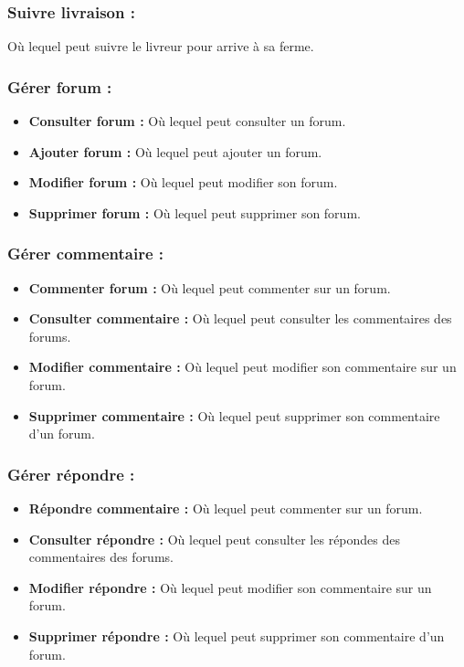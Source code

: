 \documentclass[16pt,fleqn]{article} %
\begin{document}
\subsubsection{Suivre livraison :}
Où lequel peut suivre le livreur pour arrive à sa ferme.

\subsubsection{Gérer forum :}
    \begin{itemize}
        \item \textbf{Consulter forum :} Où lequel peut consulter un forum.
        \item \textbf{Ajouter forum :} Où lequel peut ajouter un forum.
        \item \textbf{Modifier forum :} Où lequel peut modifier son forum.
        \item \textbf{Supprimer forum :} Où lequel peut supprimer son forum.
    \end{itemize}
    
\subsubsection{Gérer commentaire :}
    \begin{itemize}
        \item \textbf{Commenter forum :} Où lequel peut commenter sur un forum.
        \item \textbf{Consulter commentaire :} Où lequel peut consulter les commentaires des forums.
        \item \textbf{Modifier commentaire :} Où lequel peut modifier son commentaire sur un forum.
        \item \textbf{Supprimer commentaire :} Où lequel peut supprimer son commentaire d'un forum.
    \end{itemize}
    
\subsubsection{Gérer répondre :}
    \begin{itemize}
        \item \textbf{Répondre commentaire :} Où lequel peut commenter sur un forum.
        \item \textbf{Consulter répondre :} Où lequel peut consulter les  répondes des commentaires des forums.
        \item \textbf{Modifier répondre :} Où lequel peut modifier son commentaire sur un forum.
        \item \textbf{Supprimer répondre :} Où lequel peut supprimer son commentaire d'un forum.
    \end{itemize}  
\end{document}
